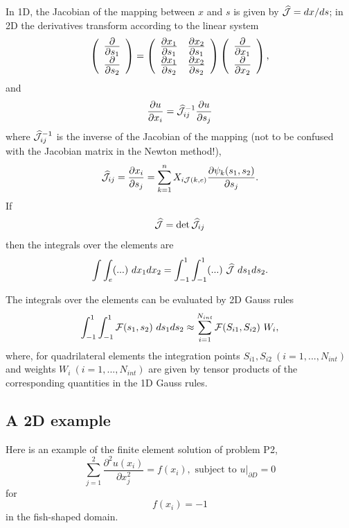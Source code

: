 In 1\-D, the Jacobian of the mapping between $x$ and $s$ is given by $ \widehat{\cal J} = dx/ds$; in 2\-D the derivatives transform according to the linear system \[ \Large \left( \begin{array}{c} \frac{\partial }{\partial s_1} \\ \frac{\partial }{\partial s_2} \end{array} \right) = \left( \begin{array}{cc} \frac{\partial x_1 }{\partial s_1} & \frac{\partial x_2}{\partial s_1} \\ \frac{\partial x_1 }{\partial s_2} & \frac{\partial x_2}{\partial s_2} \end{array} \right) \left( \begin{array}{c} \frac{\partial }{\partial x_1} \\ \frac{\partial }{\partial x_2} \end{array} \right), \] and \[ \frac{\partial u}{\partial x_i} = \widehat{\cal J}_{ij}^{-1} \frac{\partial u}{\partial s_j} \] where $ \widehat{\cal J}_{ij}^{-1} $ is the inverse of the Jacobian of the mapping (not to be confused with the Jacobian matrix in the Newton method!), \[ \widehat{\cal J}_{ij} = \frac{\partial x_i}{\partial s_j} = \sum_{k=1}^n X_{i{\cal J}(k,e)} \frac{\partial \psi_k(s_1,s_2)}{\partial s_j}. \] If \[ \widehat{\cal J} = \det \widehat{\cal J}_{ij} \] then the integrals over the elements are \[ \int \int_e (...) \ dx_1 dx_2 = \int_{-1}^{1} \int_{-1}^{1} (...) \ \widehat{\cal J} \ ds_1 ds_2. \]

The integrals over the elements can be evaluated by 2\-D Gauss rules \[ \int_{-1}^1 \int_{-1}^1 {\cal F}(s_1,s_2) \ ds_1 ds_2 \approx \sum_{i=1}^{N_{int}} {\cal F}(S_{i1},S_{i2}) \ W_{i}, \] where, for quadrilateral elements the integration points $S_{i1},S_{i2} \ (i=1,...,N_{int})$ and weights $ W_{i} \ (i=1,...,N_{int})$ are given by tensor products of the corresponding quantities in the 1\-D Gauss rules.



\hypertarget{index_example_P2}{}\subsection{A 2\-D example}\label{index_example_P2}
Here is an example of the finite element solution of problem P2, \[ \sum_{j=1}^2 \frac{\partial^2 u(x_i)}{\partial x_j^2} = f(x_i), \mbox{\ \ \ subject to $u|_{\partial D}=0$} \] for \[ f(x_i) = -1\] in the fish-\/shaped domain.

